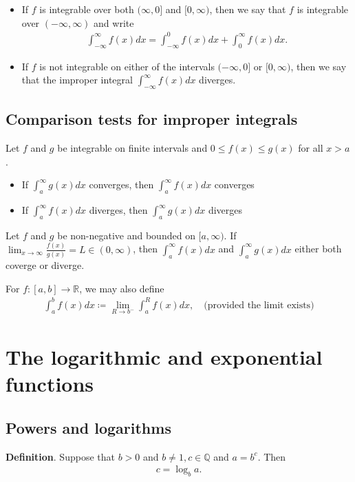 \documentclass{report}
\begin{document}
	\begin{itemize}
		\item If $f$ is integrable over both $(\infty, 0]$ and $[0, \infty)$, then we say that $f$ is integrable over $(-\infty, \infty)$ and write
			\begin{align*}
				\int_{-\infty}^\infty f(x) dx = \int_{-\infty}^0 f(x) dx + \int_0^\infty f(x) dx.
			\end{align*}
		\item If $f$ is not integrable on either of the intervals $(-\infty,0]$ or $[0,\infty)$, then we say that the improper integral $\displaystyle\int_{-\infty}^\infty f(x) dx$ diverges.
	\end{itemize}
	
	\section{Comparison tests for improper integrals}

	Let $f$ and $g$ be integrable on finite intervals and $0 \leq f(x) \leq g(x)$ for all $x > a$.
	\begin{itemize}
		\item If $\displaystyle\int_a^\infty g(x) dx$ converges, then $\int_a^\infty f(x) dx$ converges
		\item If $\displaystyle\int_a^\infty f(x) dx$ diverges, then $\int_a^\infty g(x) dx$ diverges
	\end{itemize}
	Let $f$ and $g$ be non-negative and bounded on $[a,\infty)$. If $\displaystyle\lim_{x\to \infty} \frac{f(x)}{g(x)} = L \in (0,\infty)$, then $\displaystyle\int_a^\infty f(x) dx$ and $\displaystyle\int_a^\infty g(x) dx$ either both coverge or diverge.

	For $f:[a,b] \to \mathbb{R}$, we may also define
	\begin{align*}
		\int_a^b f(x) dx \coloneq \lim_{R\to b^-} \int_a^R f(x) dx, \quad \text{(provided the limit exists)}
	\end{align*}

\chapter{The logarithmic and exponential functions}

	\section{Powers and logarithms}

	\textbf{Definition}. Suppose that $b > 0$ and $b \neq 1, c \in \mathbb{Q}$ and $a = b^c$. Then
		\begin{align*}
			c = \log_b a.
		\end{align*}
	
\end{document}
